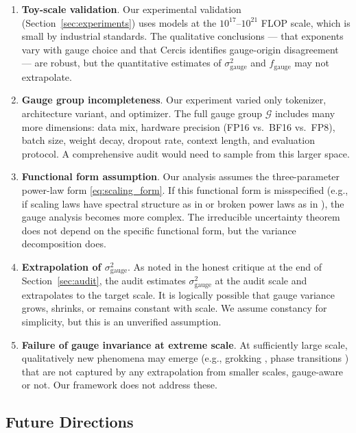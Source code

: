 \documentclass[12pt,a4paper]{article}
\theoremstyle{remark}
\begin{document}
\begin{enumerate}[label=L\arabic*:, leftmargin=*]
    \item \textbf{Toy-scale validation}. Our experimental validation (Section~\ref{sec:experiments}) uses models at the $10^{17}$--$10^{21}$ FLOP scale, which is small by industrial standards. The qualitative conclusions — that exponents vary with gauge choice and that Cercis identifies gauge-origin disagreement — are robust, but the quantitative estimates of $\sigma^2_{\text{gauge}}$ and $f_{\text{gauge}}$ may not extrapolate.
    \item \textbf{Gauge group incompleteness}. Our experiment varied only tokenizer, architecture variant, and optimizer. The full gauge group $\mathcal{G}$ includes many more dimensions: data mix, hardware precision (FP16 vs.\ BF16 vs.\ FP8), batch size, weight decay, dropout rate, context length, and evaluation protocol. A comprehensive audit would need to sample from this larger space.
    \item \textbf{Functional form assumption}. Our analysis assumes the three-parameter power-law form \eqref{eq:scaling_form}. If this functional form is misspecified (e.g., if scaling laws have spectral structure as in \cite{rosenfeld2020construct} or broken power laws as in \cite{caballero2023broken}), the gauge analysis becomes more complex. The irreducible uncertainty theorem does not depend on the specific functional form, but the variance decomposition does.
    \item \textbf{Extrapolation of $\sigma^2_{\text{gauge}}$}. As noted in the honest critique at the end of Section~\ref{sec:audit}, the audit estimates $\sigma^2_{\text{gauge}}$ at the audit scale and extrapolates to the target scale. It is logically possible that gauge variance grows, shrinks, or remains constant with scale. We assume constancy for simplicity, but this is an unverified assumption.
    \item \textbf{Failure of gauge invariance at extreme scale}. At sufficiently large scale, qualitatively new phenomena may emerge (e.g., grokking \cite{power2022grokking}, phase transitions \cite{olah2020zoom}) that are not captured by any extrapolation from smaller scales, gauge-aware or not. Our framework does not address these.
\end{enumerate}

\subsection{Future Directions}
\end{document}
